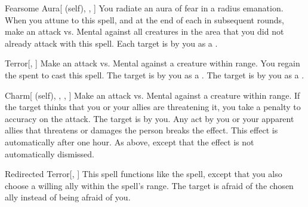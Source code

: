 \lowercase{\hypertarget{spell:Fearsome Aura}{}}\label{spell:Fearsome Aura}
\begin{attuneability}[\nth{1}]{\hypertarget{spell:Fearsome Aura}{Fearsome Aura}}[ (self), , ]
You radiate an aura of fear in a \arealarge radius emanation.
When you attune to this spell, and at the end of each  in subsequent rounds, make an attack vs. Mental against all creatures in the area that you did not already attack with this spell.
\hit Each target is  by you as a .
\end{attuneability}
\vspace{0.25em}



\lowercase{\hypertarget{spell:Terror}{}}\label{spell:Terror}
\begin{apability}[\nth{1}]{\hypertarget{spell:Terror}{Terror}}[, ]
Make an attack vs. Mental against a creature within \rngmed range.
\miss You regain the  spent to cast this spell.
\hit The target is \frightened by you as a .
\crit The target is \panicked by you as a .
\end{apability}
\vspace{0.25em}



\lowercase{\hypertarget{spell:Charm}{}}\label{spell:Charm}
\begin{attuneability}[\nth{2}]{\hypertarget{spell:Charm}{Charm}}[ (self), , , ]
Make an attack vs. Mental against a creature within \rnglong range.
If the target thinks that you or your allies are threatening it, you take a  penalty to accuracy on the attack.
\hit The target is \charmed by you.
Any act by you or your apparent allies that threatens or damages the  person breaks the effect.
This effect is automatically  after one hour.
\crit As above, except that the effect is not automatically dismissed.
\end{attuneability}
\vspace{0.25em}



\lowercase{\hypertarget{spell:Redirected Terror}{}}\label{spell:Redirected Terror}
\begin{apability}[\nth{2}]{\hypertarget{spell:Redirected Terror}{Redirected Terror}}[, ]
This spell functions like the  spell, except that you also choose a willing ally within the spell's range.
The target is afraid of the chosen ally instead of being afraid of you.
\end{apability}
\vspace{0.25em}



